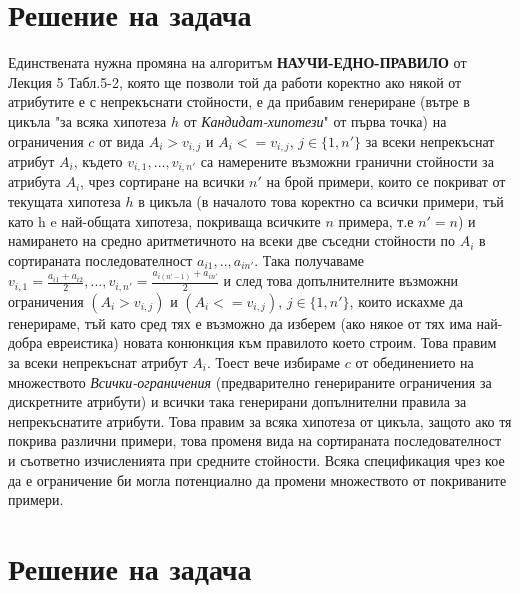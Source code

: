 \documentclass[12pt]{article}
\begin{document}
	
	
	\tableofcontents
	
	
	
	\newpage
	
	\section{Решение на задача }
	
	Единствената нужна промяна на алгоритъм \textbf{НАУЧИ-ЕДНО-ПРАВИЛО} от Лекция 5 Табл.5-2, която ще позволи той да работи коректно ако някой от атрибутите е с непрекъснати стойности, е да прибавим генериране (вътре в цикъла "за всяка хипотеза $h$ от \textit{Кандидат-хипотези}" от първа точка) на ограничения $c$ от вида $A_{i} > v_{i,j}$ и $A_{i} <= v_{i,j}$, $j \in \{1, n'\}$ за всеки непрекъснат атрибут $A_{i}$, където $v_{i,1},...,v_{i,n'}$ са намерените възможни гранични стойности за атрибута $A_i$, чрез сортиране на всички $n'$ на брой примери, които се покриват от текущата хипотеза $h$ в цикъла (в началото това коректно са всички примери, тъй като h e най-общата хипотеза, покриваща всичките $n$ примера, т.е $n' = n$) и намирането на средно аритметичното на всеки две съседни стойности по $A_{i}$ в сортираната последователност $a_{i1},..,a_{in'}$. Така получаваме $v_{i,1} = \frac{a_{i1}+a_{i2}}{2},...,v_{i,n'} = \frac{a_{i(n'-1)}+a_{in'}}{2}$ и след това допълнителните възможни ограничения $(A_{i} > v_{i,j})$ и $(A_{i} <= v_{i,j})$, $j \in \{1, n'\}$, които искахме да генерираме, тъй като сред тях е възможно да изберем (ако някое от тях има най-добра евреистика) новата конюнкция към правилото което строим.
	Това правим за всеки непрекъснат атрибут $A_{i}$. Тоест вече избираме $c$ от обединението на множеството \textit{Всички-ограничения} (предварително генерираните ограничения за дискретните атрибути) и всички така генерирани допълнителни правила за непрекъснатите атрибути.  Това правим за всяка хипотеза от цикъла, защото ако тя покрива различни примери, това променя вида на сортираната последователност и съответно изчисленията при средните стойности. Всяка спецификация чрез кое да е ограничение би могла потенциално да промени множеството от покриваните примери.
	

	\newpage
	
	\section{Решение на задача }
	
\end{document}
